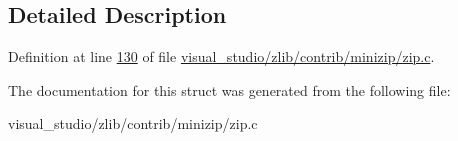 \subsection{Detailed Description}


Definition at line \hyperlink{visual__studio_2zlib_2contrib_2minizip_2zip_8c_source_l00130}{130} of file \hyperlink{visual__studio_2zlib_2contrib_2minizip_2zip_8c_source}{visual\+\_\+studio/zlib/contrib/minizip/zip.\+c}.



The documentation for this struct was generated from the following file\+:\begin{DoxyCompactItemize}
\item 
visual\+\_\+studio/zlib/contrib/minizip/zip.\+c\end{DoxyCompactItemize}
